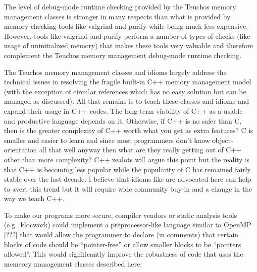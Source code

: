 \documentclass[pdf,ps2pdf,11pt]{SANDreport}
\begin{document}
The level of debug-mode runtime checking provided by the Teuchos
memory management classes is stronger in many respects than what is
provided by memory checking tools like valgrind and purify while being
much less expensive.  However, tools like valgrind and purify perform
a number of types of checks (like usage of uninitialized memory) that
makes these tools very valuable and therefore complement the Teuchos
memory management debug-mode runtime checking.

The Teuchos memory management classes and idioms largely address the
technical issues in resolving the fragile built-in C++ memory
management model (with the exception of circular references which has
no easy solution but can be managed as discussed).  All that remains
is to teach these classes and idioms and expand their usage in C++
codes.  The long-term viability of C++ as a usable and productive
language depends on it.  Otherwise, if C++ is no safer than C, then is
the greater complexity of C++ worth what you get as extra features?  C
is smaller and easier to learn and since most programmers don't know
object-orientation all that well anyway then what are they really
getting out of C++ other than more complexity?  C++ zealots will argue
this point but the reality is that C++ is becoming less popular while
the popularity of C has remained fairly stable over the last decade.
I believe that idioms like are advocated here can help to avert this
trend but it will require wide community buy-in and a change in the
way we teach C++.

To make our programs more secure, compiler vendors or static analysis
tools (e.g.\ klocwork) could implement a preprocessor-like language
similar to OpenMP [???] that would allow the programmer to declare (in
comments) that certain blocks of code should be ``pointer-free'' or
allow smaller blocks to be ``pointers allowed''.  This would
significantly improve the robustness of code that uses the memeory
management classes described here.



%

\clearpage
\providecommand*{\phantomsection}{}
\phantomsection
{}



%
\appendix
\end{document}
